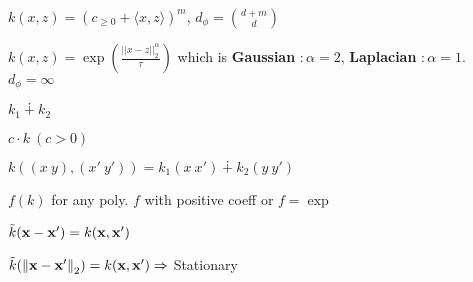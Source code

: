\begin{definition}
  \(k(x, z) = (c_{\geq 0} + \langle x, z \rangle)^m\), \(d_\phi = \binom{d + m}{d}\)
\end{definition}

\begin{definition}
  \(k(x, z)  = \exp\left(\frac{||x - z||_2^\alpha}{\tau}\right)\) which is \textbf{Gaussian} \(: \alpha = 2\), \textbf{Laplacian} \(: \alpha = 1\). \(d_\phi = \infty\)
\end{definition}

\begin{definition}
  \begin{itemize*}
    \item \(k_1 \dotplus k_2\)
    \item \(c\cdot k \ (c >0)\)
    \item \(k((x \ y), (x' \ y')) = k_1(x \ x') \dotplus k_2(y \ y') \)
    \item \(f(k)\) for any poly. \(f\) with positive coeff or \(f = \exp\)
  \end{itemize*}
\end{definition}

\begin{definition}[Stationary]
  \(\tilde k (\vb{x} - \vb{x}') = k(\vb{x}, \vb{x}')\)
\end{definition}

\begin{definition}[Isotropic]
  \(\tilde k (\norm{\vb{x} - \vb{x}'}_2) = k(\vb{x}, \vb{x}') \Rightarrow\) Stationary
\end{definition}

